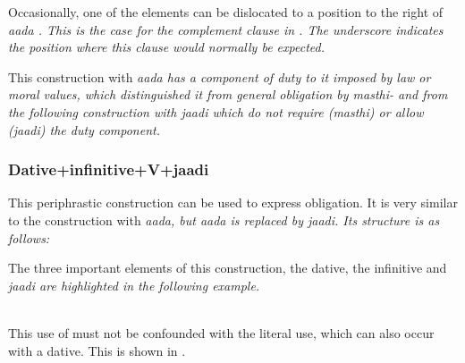 
Occasionally, one of the elements can be dislocated to a position to the right of \em aada \em. This is the case for the complement clause in . The underscore indicates the position where this clause would normally be expected.


This  construction with \em aada \em has a component of duty to it imposed by law or moral values, which distinguished it from general obligation by \em masthi- \em and from the following construction with \em jaadi \em which do not require (\em masthi\em) or allow (\em jaadi\em) the duty component.


\subsubsection[\textsc{dat + inf + V} + jaadi]{Dative+infinitive+V+jaadi}\label{sec:wc:Dative+infinitive+V+jaadi}
This periphrastic construction can be used to express obligation. It is very similar to the construction with \em aada\em, but \em aada \em is replaced by \em jaadi\em. Its structure is as follows:


The three important elements of this construction, the dative, the infinitive and \em jaadi \em are highlighted in the following example.


 \\
This use of  must not be confounded with the literal use, which can also occur with a dative. This is shown in .

